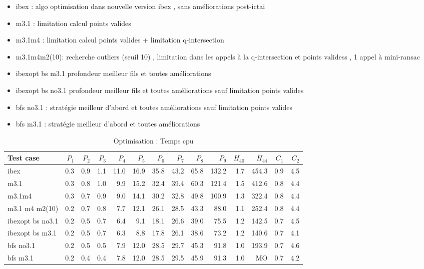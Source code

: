 \documentclass{article}
\begin{document}
\begin{itemize}
\item{ibex} : algo optimisation dans nouvelle version ibex , sans am\'eliorations post-ictai
\item{m3.1} : limitation calcul points valides
\item {m3.1m4} : limitation calcul points valides + limitation q-intersection
\item {m3.1m4m2(10)}: recherche outliers (seuil 10) , limitation dans les appels \`a la q-intersection et points validess , 1 appel \`a mini-ransac
\item {ibexopt bs m3.1} profondeur meilleur fils et toutes am\'eliorations
\item {ibexopt bs no3.1} profondeur meilleur fils et toutes am\'eliorations sauf limitation points valides
\item{bfs no3.1} : strat\'egie meilleur d'abord  et toutes am\'eliorations sauf limitation points valides
\item{bfs m3.1} : strat\'egie meilleur d'abord et  toutes am\'eliorations 
\end{itemize}

\begin{table*}[htb]
\caption{Optimisation : Temps cpu}
\begin{center}
{\scriptsize
\begin{tabular}{|l||r|r|r|r|r|r|r|r|r|r||r|r|r|}
\hline
Test case & $P_1$ & $P_2$ & $P_3$ & $P_4$ & $P_5$ & $P_6$ & $P_7$ & $P_8$ & $P_9$ & $H_{40}$ & $H_{44}$ &  $C_1$ & $C_2$\\
\hline
ibex &0.3& 0.9   & 1.1 &11.0 & 16.9 &35.8& 43.2 & 65.8 &  132.2 & 1.7 & 454.3& 0.9& 4.5 \\
m3.1  & 0.3 & 0.8& 1.0 & 9.9 & 15.2 & 32.4 & 39.4 & 60.3 & 121.4&  1.5 & 412.6 & 0.8 & 4.4 \\
m3.1m4&0.3 &0.7 & 0.9 &9.0 & 14.1 &30.2 &32.8 &49.8 &100.9 &1.3 &322.4 &0.8 & 4.4 \\
m3.1 m4 m2(10)&0.2 &0.7 &0.8 &7.7 & 12.1 &26.1 &28.5 &43.3 &88.0 &1.1 & 252.4 & 0.8 & 4.4 \\
ibexopt bs no3.1&0.2  &0.5 & 0.7 & 6.4 &9.1 &18.1 &26.6 &39.0 &75.5 &1.2 &142.5 &0.7& 4.5 \\
ibexopt bs m3.1& 0.2 & 0.5 & 0.7 & 6.3 & 8.8 & 17.8 & 26.1  &38.6  & 73.2 &1.2  &140.6 &0.7 &4.1 \\
bfs no3.1 & 0.2  & 0.5 & 0.5 & 7.9 & 12.0 & 28.5 & 29.7 & 45.3 & 91.8 & 1.0 & 193.9& 0.7& 4.6\\
bfs m3.1& 0.2  & 0.4 & 0.4 & 7.8 & 12.0 & 28.5 & 29.5 & 45.9 & 91.3 & 1.0 & MO & 0.7& 4.2\\

\hline
\end{tabular}
}
\end{center}
\label{optimresults}
\end{table*}
\end{document}
